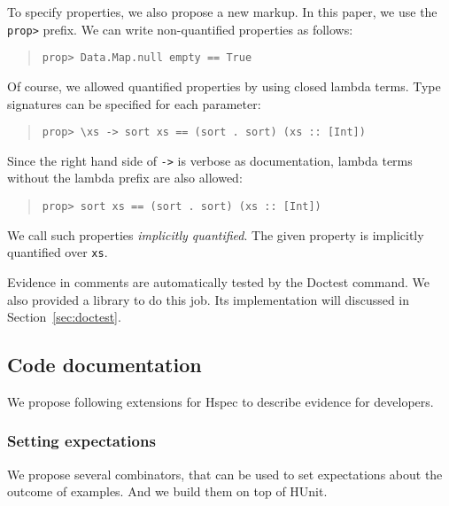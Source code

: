 \documentclass[preprint]{sigplanconf}
\begin{document}
\noindent To specify properties, we also propose a new markup. In this paper, we
use the {\tt prop>} prefix. We can write non-quantified properties as follows:

\begin{quote}
\small
\begin{verbatim}
prop> Data.Map.null empty == True
\end{verbatim}
\end{quote}

\noindent Of course, we allowed quantified properties by using closed
lambda terms.
Type signatures can be specified for each parameter:

\begin{quote}
\small
\begin{verbatim}
prop> \xs -> sort xs == (sort . sort) (xs :: [Int])
\end{verbatim}
\end{quote}

\noindent Since the right hand side of {\tt ->} is verbose as documentation,
lambda terms without the lambda prefix are also allowed:

\begin{quote}
\small
\begin{verbatim}
prop> sort xs == (sort . sort) (xs :: [Int])
\end{verbatim}
\end{quote}

\noindent We call such properties \emph{implicitly quantified}.  The
given property is implicitly quantified over \verb|xs|.

Evidence in comments are automatically
tested by the Doctest command. We also provided a library
to do this job. Its implementation will discussed in Section~\ref{sec:doctest}.

\subsection{Code documentation}
\label{sec:code-doc}

We propose following extensions for Hspec to
describe evidence for developers.

\subsubsection{Setting expectations}

We propose several combinators, that can be used to set expectations
about the outcome of examples.  And we build them on top of
HUnit.
\end{document}
